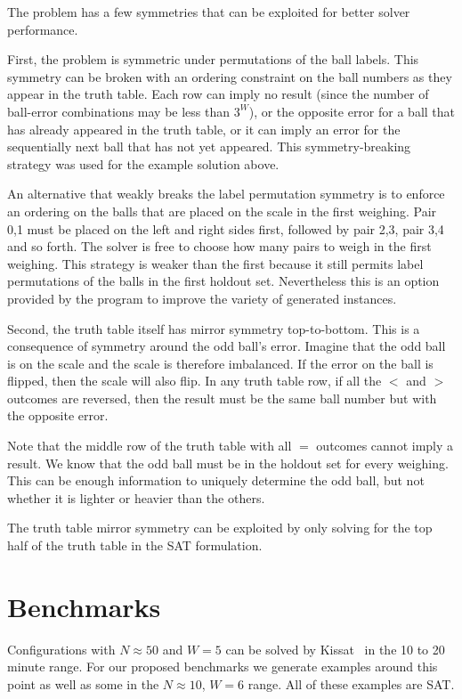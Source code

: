 \documentclass[conference]{IEEEtran}
\begin{document}
The problem has a few symmetries that can be exploited for better solver performance.

First, the problem is symmetric under permutations of the ball labels.
This symmetry can be broken with an ordering constraint on the ball numbers as they appear in the truth table.
Each row can imply no result (since the number of ball-error combinations may be less than $3^W$),
or the opposite error for a ball that has already appeared in the truth table, or it can imply an error
for the sequentially next ball that has not yet appeared.
This symmetry-breaking strategy was used for the example solution above.

An alternative that weakly breaks the label permutation symmetry is to enforce an ordering on the balls
that are placed on the scale in the first weighing. Pair 0,1 must be placed on the left and right sides first,
followed by pair 2,3, pair 3,4 and so forth.
The solver is free to choose how many pairs to weigh in the first weighing.
This strategy is weaker than the first because it still permits label permutations of the balls in the first holdout set.
Nevertheless this is an option provided by the program to improve the variety of generated instances.

Second, the truth table itself has mirror symmetry top-to-bottom.
This is a consequence of symmetry around the odd ball's error.
Imagine that the odd ball is on the scale and the scale is therefore imbalanced.
If the error on the ball is flipped, then the scale will also flip.
In any truth table row, if all the $<$ and $>$ outcomes are reversed, then the result must be the same ball number but with the opposite error.

Note that the middle row of the truth table with all $=$ outcomes cannot imply a result.
We know that the odd ball must be in the holdout set for every weighing.
This can be enough information to uniquely determine the odd ball, but not whether it is lighter or heavier than the others.

The truth table mirror symmetry can be exploited by only solving for the top half of the truth table in the SAT formulation.

\section{Benchmarks}

Configurations with $N \approx 50$ and $W=5$ can be solved by Kissat~\cite{k1} in the 10 to 20 minute range.
For our proposed benchmarks we generate examples around this point as well as some in the $N \approx 10$, $W=6$ range.
All of these examples are SAT.
\end{document}
